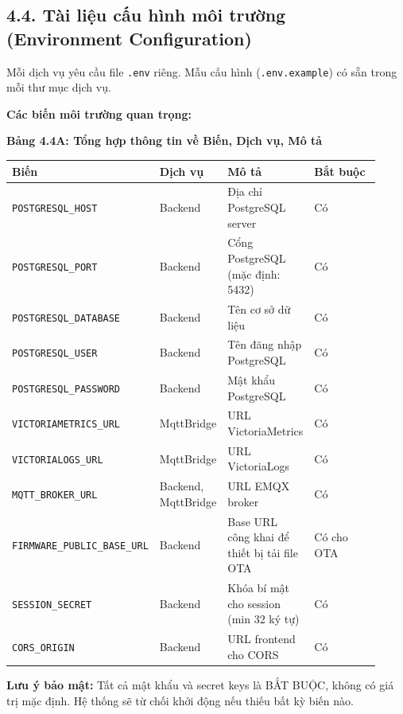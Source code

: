\documentclass[13pt,a4paper]{extarticle}
\newcounter{none} %
\newcommand{\thesislongtableorignewline}{}
\let\thesislongtableorignewline\\
\renewcommand{\\}{\thesislongtableorignewline\hline}%
\let\\\thesislongtableorignewline
\newcommand{\thesistabletitle}[1]{%
  \begin{center}\textbf{#1}\end{center}%
}
\begin{document}
\subsection{4.4. Tài liệu cấu hình môi trường (Environment
Configuration)}\label{44-tuxe0i-liux1ec7u-cux1ea5u-huxecnh-muxf4i-trux1b0ux1eddng-environment-configuration}

Mỗi dịch vụ yêu cầu file \texttt{.env} riêng. Mẫu cấu hình
(\texttt{.env.example}) có sẵn trong mỗi thư mục dịch vụ.

\textbf{Các biến môi trường quan trọng:}

{\def\LTcaptype{none} %
\thesistabletitle{Bảng 4.4A: Tổng hợp thông tin về Biến, Dịch vụ, Mô tả}

\begin{longtable}{|p{0.30\linewidth}|p{0.16\linewidth}|p{0.20\linewidth}|p{0.26\linewidth}|}
\hline \textbf{Biến} & \textbf{Dịch vụ} & \textbf{Mô tả} & \textbf{Bắt buộc} \\
\hline
\endhead
\hline
\endlastfoot
\texttt{POSTGRESQL\_HOST} & Backend & Địa chỉ PostgreSQL server & Có \\
\texttt{POSTGRESQL\_PORT} & Backend & Cổng PostgreSQL (mặc định: 5432) &
Có \\
\texttt{POSTGRESQL\_DATABASE} & Backend & Tên cơ sở dữ liệu & Có \\
\texttt{POSTGRESQL\_USER} & Backend & Tên đăng nhập PostgreSQL & Có \\
\texttt{POSTGRESQL\_PASSWORD} & Backend & Mật khẩu PostgreSQL & Có \\
\texttt{VICTORIAMETRICS\_URL} & MqttBridge & URL VictoriaMetrics & Có \\
\texttt{VICTORIALOGS\_URL} & MqttBridge & URL VictoriaLogs & Có \\
\texttt{MQTT\_BROKER\_URL} & Backend, MqttBridge & URL EMQX broker &
Có \\
\texttt{FIRMWARE\_PUBLIC\_BASE\_URL} & Backend & Base URL công khai để
thiết bị tải file OTA & Có cho OTA \\
\texttt{SESSION\_SECRET} & Backend & Khóa bí mật cho session (min 32 ký
tự) & Có \\
\texttt{CORS\_ORIGIN} & Backend & URL frontend cho CORS & Có \\
\end{longtable}
}

\textbf{Lưu ý bảo mật:} Tất cả mật khẩu và secret keys là BẮT BUỘC,
không có giá trị mặc định. Hệ thống sẽ từ chối khởi động nếu thiếu bất
kỳ biến nào.
\end{document}
